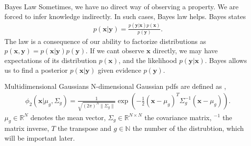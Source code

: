 \documentclass[notes]{beamer}
\begin{document}
    \begin{frame}{Bayes Law \cite{deisenroth2020mathematics}}
      Sometimes, we have no direct way of observing a property. We are forced to infer knowledge indirectly.
      In such cases, Bayes law helps. Bayes states
      \begin{align}
        p(\mathbf{x}|\mathbf{y}) = \frac{p(\mathbf{y}|\mathbf{x})p(\mathbf{x})}{p(\mathbf{y})}.
      \end{align}
      The law is a consequence of our ability to factorize distributions as $p(\mathbf{x},\mathbf{y})
      = p(\mathbf{x}|\mathbf{y})p(\mathbf{y})$.
      If we cant observe $\mathbf{x}$ directly, we may have expectations of its distribution $p(\mathbf{x})$,
      and the likelihood $p(\mathbf{y}|\mathbf{x})$. Bayes allows us to find a posterior $p(\mathbf{x}|\mathbf{y})$
      given evidence $p(\mathbf{y})$.

    \end{frame}

    \begin{frame}{Multidimensional Gaussians}
      N-dimensional Gaussian pdfs are defined as \cite{mcnicholas2016mixture},
      \begin{align}
      \phi_2(\mathbf{x} | \mu_g, \Sigma_g) = \frac{1}{\sqrt{(2\pi)^N \| \Sigma_g \|}} \exp({-\frac{1}{2}(\mathbf{x}-\mu_g)^T \Sigma_g^{-1}(\mathbf{x}-\mu_g)}).
      \end{align}
      $\mu_g \in \mathbb{R}^N$ denotes the mean vector, $\Sigma_g \in \mathbb{R}^{N\times N}$ the covariance matrix, $^{-1}$ the matrix inverse, $T$ the transpose and $g \in \mathbb{N}$ the number of the distrubtion, which will be important later. 
    \end{frame}
\end{document}
